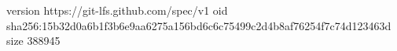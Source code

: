 version https://git-lfs.github.com/spec/v1
oid sha256:15b32d0a6b1f3b6e9aa6275a156bd6c6c75499c2d4b8af76254f7c74d123463d
size 388945
